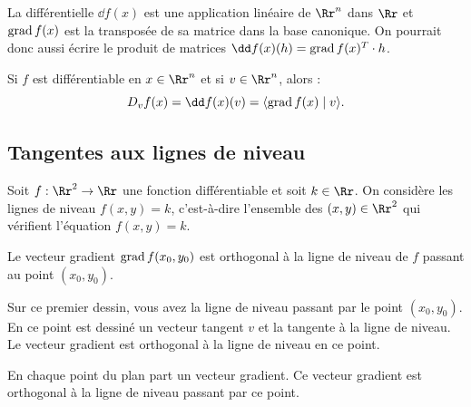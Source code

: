 \documentclass[11pt, class=report,crop=false]{standalone}
\begin{document}
La différentielle $\dd f(x)$ est une application linéaire de $\Rr^n$ dans $\Rr$ et $\operatorname{grad} f (x)$ est la transposée de sa matrice dans la base canonique.
On pourrait donc aussi écrire le produit de matrices $\dd f(x)(h) = \grad f (x)^T \cdot h$.

\bigskip


Si $f$ est différentiable en $x \in \Rr^n$ et si $v \in \Rr^n$, alors :
$$D_v f(x) = \dd f (x) (v) = \langle \grad f (x) \mid v \rangle.$$



\subsection{Tangentes aux lignes de niveau}


Soit $f : \Rr^2 \to \Rr$ une fonction différentiable et soit $k \in \Rr$. On considère les lignes de niveau $f(x,y)=k$, c'est-à-dire l'ensemble des $(x,y) \in \Rr^2$ qui vérifient l'équation $f(x,y)=k$.


\begin{proposition}
Le vecteur gradient $\operatorname{grad} f(x_0,y_0)$ est orthogonal à la ligne de niveau de $f$ passant au point $(x_0,y_0)$. 
\end{proposition}


Sur ce premier dessin, vous avez  la ligne de niveau passant par le point $(x_0,y_0)$. En ce point est dessiné  un vecteur tangent $v$ et la tangente à la ligne de niveau. 
Le vecteur gradient  est orthogonal à la ligne de niveau en ce point.


\bigskip


\bigskip

En chaque point du plan part un vecteur gradient. Ce vecteur gradient est orthogonal à la ligne de niveau passant par ce point.

\end{document}
